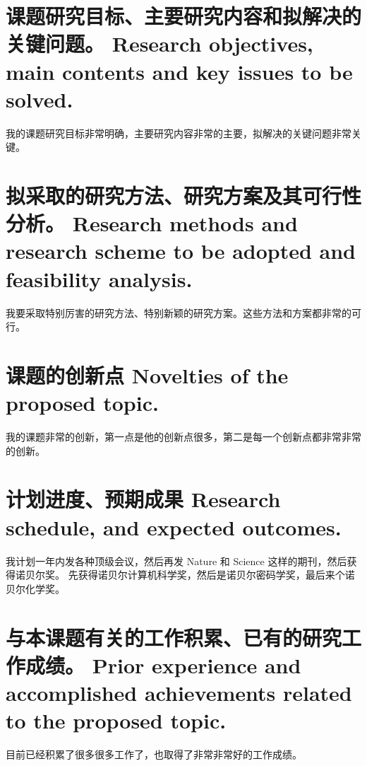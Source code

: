 \documentclass[a4paper,zihao=-4,AutoFakeBold]{ctexart}
\begin{document}
\section{课题研究目标、主要研究内容和拟解决的关键问题。
  Research objectives, main contents and key issues to be solved.}

我的课题研究目标非常明确，主要研究内容非常的主要，拟解决的关键问题非常关键。



\section{拟采取的研究方法、研究方案及其可行性分析。
  Research methods and research scheme to be adopted
  and feasibility analysis.}

我要采取特别厉害的研究方法、特别新颖的研究方案。这些方法和方案都非常的可行。



\section{课题的创新点 Novelties of the proposed topic.}

我的课题非常的创新，第一点是他的创新点很多，第二是每一个创新点都非常非常的创新。



\section{计划进度、预期成果 Research schedule, and expected outcomes.}

我计划一年内发各种顶级会议，然后再发 Nature 和 Science 这样的期刊，然后获得诺贝尔奖。
先获得诺贝尔计算机科学奖，然后是诺贝尔密码学奖，最后来个诺贝尔化学奖。



\section{与本课题有关的工作积累、已有的研究工作成绩。
  Prior experience and accomplished achievements
  related to the proposed topic.}


目前已经积累了很多很多工作了，也取得了非常非常好的工作成绩。


\makesignature
\end{document}
